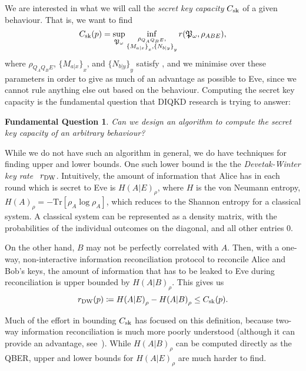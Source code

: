 \documentclass[10pt, a4paper]{article}
\numberwithin{equation}{section} %
\theoremstyle{definition}
\theoremstyle{plain}
\newtheorem{funqn}{Fundamental Question}
\newcommand{\?}{\mathrel{?}} %
\newcommand{\Tr}{\mathrm{Tr}} %
\newcommand{\sk}{\rm sk}
\newcommand{\DW}{\rm DW}
\begin{document}
    We are interested in what we will call the \emph{secret key capacity} \(C_{\sk}\) of a given behaviour. That is, we want to find 
    \begin{equation}\label{eqn:seckeycap}
      C_{\sk}(p) = \sup_{\mathfrak{P}_{\omega}} \inf_{ \substack{
          \rho_{Q_A Q_B E}, \\
          {\{M_{a|x}\}}_x, {\{N_{b|y}\}}_y
        }
      } r(\mathfrak{P}_{\omega}, \rho_{ABE}),
    \end{equation}
    where \(\rho_{Q_A Q_B E}\), \({\{M_{a|x}\}}_x\), and \({\{N_{b|y}\}}_y\) satisfy , and we minimise over these parameters in order to give as much of an advantage as possible to Eve, since we cannot rule anything else out based on the behaviour. Computing the secret key capacity is the fundamental question that DIQKD research is trying to answer:
    \begin{funqn}\label{fqn:cap}
      Can we design an algorithm to compute the secret key capacity of an arbitrary behaviour?
    \end{funqn}

    While we do not have such an algorithm in general, we do have techniques for finding upper and lower bounds. One such lower bound is the the \emph{Devetak-Winter key rate}~\cite{DevetakWinter} \(r_{\DW}\). Intuitively, the amount of information that Alice has in each round which is secret to Eve is \({H(A|E)}_{\rho}\), where \(H\) is the von Neumann entropy, \({H(A)}_{\rho} = -\Tr\left[\rho_{A}\log\rho_{A}\right]\), which reduces to the Shannon entropy for a classical system. A classical system can be represented as a density matrix, with the probabilities of the individual outcomes on the diagonal, and all other entries 0.

    On the other hand, \(B\) may not be perfectly correlated with \(A\). Then, with a one-way, non-interactive information reconciliation protocol to reconcile Alice and Bob's keys, the amount of information that has to be leaked to Eve during reconciliation is upper bounded by \({H(A|B)}_{\rho}\). This gives us
    \begin{equation}
      r_{\DW}(p) \coloneqq {H(A|E)}_{\rho} - {H(A|B)}_{\rho} \leq C_{\sk}(p).
    \end{equation}

    Much of the effort in bounding \(C_{\sk}\) has focused on this definition, because two-way information reconciliation is much more poorly understood (although it can provide an advantage, see~\cite{AdvantageDistill}).  While \({H(A|B)}_{\rho}\) can be computed directly as the QBER, upper and lower bounds for \({H(A|E)}_{\rho}\) are much harder to find.
\end{document}
